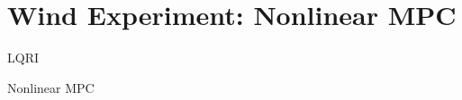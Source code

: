 \ETHslide
\section*{Wind Experiment: Nonlinear MPC}
\vspace*{\fill}

\begin{minipage}{0.5\textwidth}
	\centering
	\tiny{
	
	\tiny{LQRI}
	}
\end{minipage}
\begin{minipage}{0.5\textwidth}
\centering
\tiny{

	\tiny{Nonlinear MPC}
}
\end{minipage}

\vspace*{\fill}
\clearpage